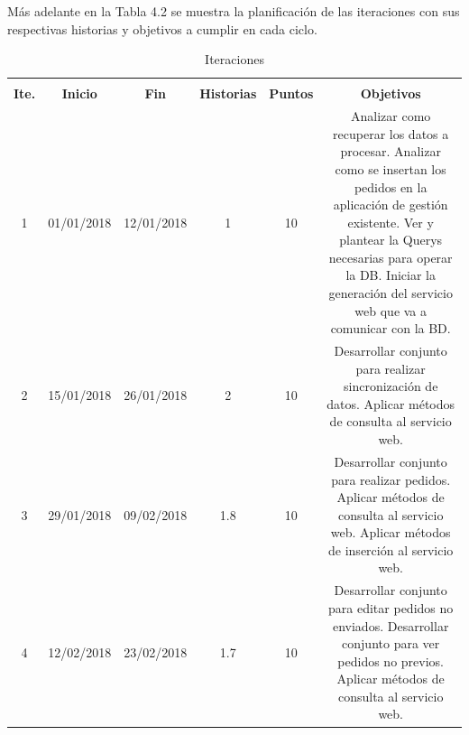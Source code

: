 \clearpage

Más adelante en la Tabla 4.2 se muestra la planificación de las iteraciones con sus respectivas historias y objetivos a cumplir en cada ciclo. 

\begin{table}[H]
	\centering
	\caption{Iteraciones}
	\label{Iteraciones}
	\renewcommand{\arraystretch}{2}
	
	\begin{tabular}{cccccc}
		\multicolumn{6}{c}{\cellcolor{tittletable}{\color{white} \textbf{Iteraciones}}} \\
		\rowcolor{HeaderCol} 
		{\color{white} \textbf{Ite.}} & {\color{white}  \textbf{Inicio}} & {\color{white} \textbf{Fin}} & {\color{white} \textbf{Historias}}  & {\color{white} \textbf{Puntos}} & {\color{white} \textbf{Objetivos}}\\ 
		\hline
		
		\multicolumn{1}{|c|}{1} & \multicolumn{1}{l|}{01/01/2018} 
		& \multicolumn{1}{c|}{12/01/2018} & \multicolumn{1}{c|}{1} 
		& \multicolumn{1}{c|}{10}  & \multicolumn{1}{p{6cm}|}{	
			Analizar como recuperar los datos a procesar.
			Analizar como se insertan los pedidos en la aplicación de gestión existente.
			Ver y plantear la Querys necesarias para operar la DB.
			Iniciar la generación del servicio web que va a comunicar con la BD.
		} \\ \hline
		\multicolumn{1}{|c|}{2} & \multicolumn{1}{l|}{15/01/2018} 
		& \multicolumn{1}{c|}{26/01/2018} & \multicolumn{1}{c|}{2} 
		& \multicolumn{1}{c|}{10}  & \multicolumn{1}{p{5.0cm}|}{
			Desarrollar conjunto para realizar sincronización de datos.	
			Aplicar métodos de consulta al servicio web.
		} \\ \hline
		
		\multicolumn{1}{|c|}{3} & \multicolumn{1}{l|}{29/01/2018} 
		& \multicolumn{1}{c|}{09/02/2018} & \multicolumn{1}{c|}{1.8} 
		& \multicolumn{1}{c|}{10}  & \multicolumn{1}{p{5.0cm}|}{
			Desarrollar conjunto para realizar pedidos.	
			Aplicar métodos de consulta al servicio web.
			Aplicar métodos de inserción al servicio web.
		} \\ \hline
		
		\multicolumn{1}{|c|}{4} & \multicolumn{1}{l|}{12/02/2018} 
		& \multicolumn{1}{c|}{23/02/2018} & \multicolumn{1}{c|}{1.7} 
		& \multicolumn{1}{c|}{10}  & \multicolumn{1}{p{5.0cm}|}{
			Desarrollar conjunto para editar pedidos no enviados.
			Desarrollar conjunto para ver pedidos no previos. 
			Aplicar métodos de consulta al servicio web.
		} \\ \hline
		

\end{tabular}
\end{table}
